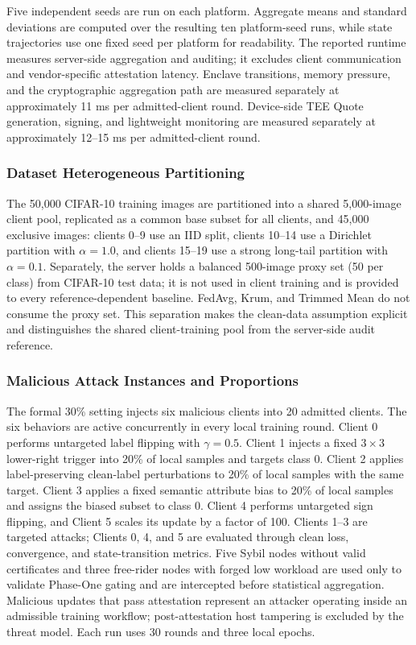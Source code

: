 \documentclass[final,5p,times,twocolumn]{elsarticle/elsarticle}
\begin{document}
Five independent seeds are run on each platform. Aggregate means and standard
deviations are computed over the resulting ten platform-seed runs, while
state trajectories use one fixed seed per platform for readability. The
reported runtime measures server-side aggregation and auditing; it excludes
client communication and vendor-specific attestation latency. Enclave
transitions, memory pressure, and the cryptographic aggregation path are
measured separately at approximately 11 ms per admitted-client round.
Device-side TEE Quote generation, signing, and lightweight monitoring are
measured separately at approximately 12--15 ms per admitted-client round.

\subsubsection{Dataset Heterogeneous Partitioning}
The 50,000 CIFAR-10 training images are partitioned into a shared 5,000-image
client pool, replicated as a common base subset for all clients, and 45,000
exclusive images: clients 0--9 use an IID split, clients 10--14 use a Dirichlet
partition with $\alpha=1.0$, and clients 15--19 use a strong long-tail partition
with $\alpha=0.1$. Separately, the server holds a balanced 500-image proxy
set (50 per class) from CIFAR-10 test data; it is not used in client training and
is provided to every reference-dependent baseline. FedAvg, Krum, and Trimmed
Mean do not consume the proxy set. This separation makes the clean-data
assumption explicit and distinguishes the shared client-training pool from the
server-side audit reference.

\subsubsection{Malicious Attack Instances and Proportions}
The formal 30\% setting injects six malicious clients into 20 admitted clients.
The six behaviors are active concurrently in every local training round. Client
0 performs untargeted label flipping with $\gamma=0.5$. Client 1 injects a
fixed $3\times3$ lower-right trigger into 20\% of local samples and targets
class 0. Client 2 applies label-preserving clean-label perturbations to 20\% of
local samples with the same target. Client 3 applies a fixed semantic attribute
bias to 20\% of local samples and assigns the biased subset to class 0. Client
4 performs untargeted sign flipping, and Client 5 scales its update by a factor
of 100. Clients 1--3 are targeted attacks; Clients 0, 4, and 5 are evaluated
through clean loss, convergence, and state-transition metrics. Five Sybil nodes
without valid certificates and three free-rider nodes with forged low workload
are used only to validate Phase-One gating and are intercepted before
statistical aggregation. Malicious updates that pass attestation represent an
attacker operating inside an admissible training workflow; post-attestation
host tampering is excluded by the threat model. Each run uses 30 rounds and
three local epochs.
\end{document}
